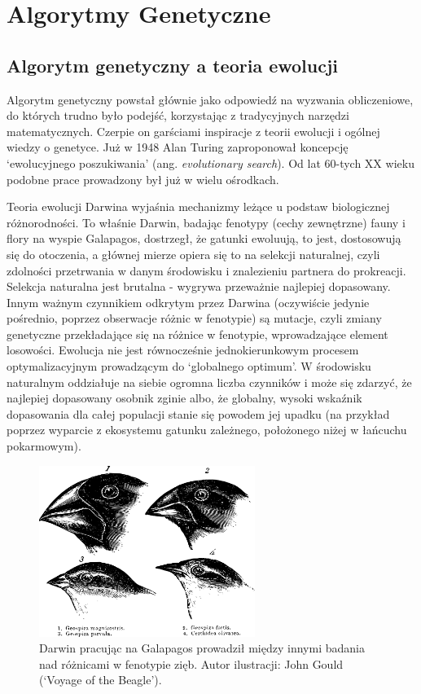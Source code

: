 \documentclass[a4paper,11pt]{article}
\begin{document}
    \newpage


    \section{Algorytmy Genetyczne}

    \subsection{Algorytm genetyczny a teoria ewolucji}

    Algorytm genetyczny powstał głównie jako odpowiedź na wyzwania obliczeniowe, do których trudno było podejść, korzystając z tradycyjnych narzędzi matematycznych. Czerpie on garściami inspiracje z teorii ewolucji i ogólnej wiedzy o genetyce. Już w 1948 Alan Turing zaproponował koncepcję `ewolucyjnego poszukiwania' (ang. \textit{evolutionary search}). Od lat 60-tych XX wieku podobne prace prowadzony był już w wielu ośrodkach\cite{IntroductionToEvolutionaryComputing2015}.

    \bigskip

    Teoria ewolucji Darwina wyjaśnia mechanizmy leżące u podstaw biologicznej różnorodności. To właśnie Darwin, badając fenotypy (cechy zewnętrzne) fauny i flory na wyspie Galapagos, dostrzegł, że gatunki ewoluują, to jest, dostosowują się do otoczenia, a głównej mierze opiera się to na selekcji naturalnej, czyli zdolności przetrwania w danym środowisku i znalezieniu partnera do prokreacji. Selekcja naturalna jest brutalna - wygrywa przeważnie najlepiej dopasowany. Innym ważnym czynnikiem odkrytym przez Darwina (oczywiście jedynie pośrednio, poprzez obserwacje różnic w fenotypie) są mutacje, czyli zmiany genetyczne przekładające się na różnice w fenotypie, wprowadzające element losowości. Ewolucja nie jest równocześnie jednokierunkowym procesem optymalizacyjnym prowadzącym do `globalnego optimum'. W środowisku naturalnym oddziałuje na siebie ogromna liczba czynników i może się zdarzyć, że najlepiej dopasowany osobnik zginie albo, że globalny, wysoki wskaźnik dopasowania dla całej populacji stanie się powodem jej upadku (na przykład poprzez wyparcie z ekosystemu gatunku zależnego, położonego niżej w łańcuchu pokarmowym)\cite{IntroductionToEvolutionaryComputing2015}.

    \bigskip

    \begin{figure}[H]
        \label{fig:darwin_birds}
        \centering
        \includegraphics[width=7cm]{darwin_birds}
        \caption{Darwin pracując na Galapagos prowadził między innymi badania nad różnicami w fenotypie zięb. Autor ilustracji: John Gould (`Voyage of the Beagle').}
    \end{figure}
\end{document}

